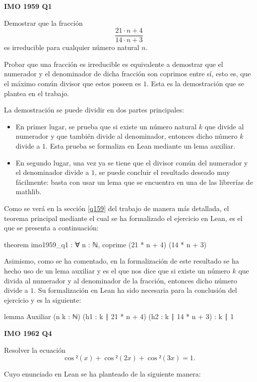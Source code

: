 \textbf{IMO 1959 Q1}

\noindent
Demostrar que la fracción
\[\frac{21⋅n+4}{14⋅n+3}\]
es irreducible para cualquier número natural \(n\).

Probar que una fracción es irreducible es equivalente a demostrar que el
numerador y el denominador de dicha fracción son coprimos entre sí, esto es,
que el máximo común divisor que estos poseen es \(1\). Esta es la demostración
que se plantea en el trabajo. 

La demostración se puede dividir en dos partes principales:
\begin{itemize}
\item En primer lugar, se prueba que si existe un número natural \(k\) que
  divide al numerador y que también divide al denominador, entonces dicho número
  \(k\) divide a \(1\). Esta prueba se formaliza en Lean mediante un lema auxiliar.

\item En segundo lugar, una vez ya se tiene que el divisor común del numerador y
  el denominador divide a \(1\), se puede concluir el resultado deseado muy
  fácilmente: basta con usar un lema que se encuentra en una de las librerías de
  mathlib.
\end{itemize}

Como se verá en la sección \ref{q159} del trabajo de manera más detallada, el
teorema principal mediante el cual se ha formalizado el ejercicio en Lean, es el
que se presenta a continuación:
\begin{leancode}
theorem imo1959_q1 : ∀ n : ℕ, coprime (21 * n + 4) (14 * n + 3)
\end{leancode}

Asimismo, como se ha comentado, en la formalización de este resultado se ha hecho
uso de un lema auxiliar y es el que nos dice que si existe un número \(k\) que
divida al numerador y al denominador de la fracción, entonces dicho número divide
a \(1\). Su formalización en Lean ha sido necesaria para la conclusión del
ejercicio y es la siguiente:
\begin{leancode}
lemma Auxiliar
  (n k : ℕ)
  (h1 : k ∣ 21 * n + 4)
  (h2 : k ∣ 14 * n + 3)
  : k ∣ 1
\end{leancode}

\textbf{IMO 1962 Q4}

\noindent
Resolver la ecuación
\[\cos²(x)+\cos²(2x)+\cos²(3x)=1. \]

Cuyo enunciado en Lean se ha planteado de la siguiente manera:

